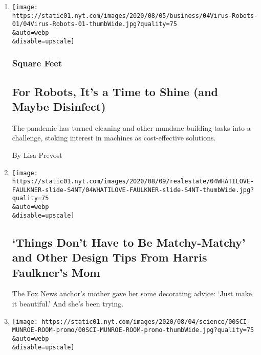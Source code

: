 \begin{enumerate}
\def\labelenumi{\arabic{enumi}.}
\item
  \href{/2020/08/04/business/robot-cleaning-coronavirus.html}{}

  \texttt{[image: https://static01.nyt.com/images/2020/08/05/business/04Virus-Robots-01/04Virus-Robots-01-thumbWide.jpg?quality=75\\\&auto=webp\\\&disable=upscale]}

  \hypertarget{square-feet}{%
  \subsubsection{Square Feet}\label{square-feet}}

  \hypertarget{for-robots-its-a-time-to-shine-and-maybe-disinfect}{%
  \subsection{For Robots, It's a Time to Shine (and Maybe
  Disinfect)}\label{for-robots-its-a-time-to-shine-and-maybe-disinfect}}

  The pandemic has turned cleaning and other mundane building tasks into
  a challenge, stoking interest in machines as cost-effective solutions.

  By Lisa Prevost
\item
  \href{/slideshow/2020/08/04/realestate/things-dont-have-to-be-matchy-matchy-and-other-design-tips-from-harris-faulkners-mom.html}{}

  \texttt{[image: https://static01.nyt.com/images/2020/08/09/realestate/04WHATILOVE-FAULKNER-slide-S4NT/04WHATILOVE-FAULKNER-slide-S4NT-thumbWide.jpg?quality=75\\\&auto=webp\\\&disable=upscale]}

  \hypertarget{things-dont-have-to-be-matchy-matchy-and-other-design-tips-from-harris-faulkners-mom}{%
  \subsection{`Things Don't Have to Be Matchy-Matchy' and Other Design
  Tips From Harris Faulkner's
  Mom}\label{things-dont-have-to-be-matchy-matchy-and-other-design-tips-from-harris-faulkners-mom}}

  The Fox News anchor's mother gave her some decorating advice: `Just
  make it beautiful.' And she's been trying.
\item
  \href{/2020/08/04/science/randall-munroe-xkcd-temperature.html}{}

  \texttt{[image: https://static01.nyt.com/images/2020/08/04/science/00SCI-MUNROE-ROOM-promo/00SCI-MUNROE-ROOM-promo-thumbWide.jpg?quality=75\\\&auto=webp\\\&disable=upscale]}


\end{enumerate}
